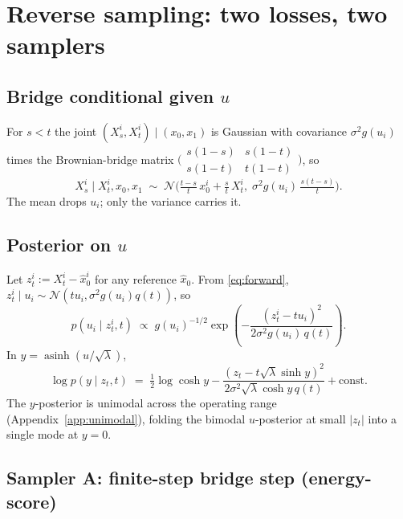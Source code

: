 \documentclass[11pt]{article}
\newcommand{\N}{\mathcal{N}}
\newcommand{\asinh}{\operatorname{asinh}}
\begin{document}
\section{Reverse sampling: two losses, two samplers}
\label{sec:reverse}

\subsection{Bridge conditional given $u$}

For $s<t$ the joint $(X_s^i, X_t^i)\mid(x_0,x_1)$ is Gaussian with
covariance $\sigma^2 g(u_i)$ times the Brownian-bridge matrix
$\bigl(\begin{smallmatrix} s(1-s) & s(1-t) \\ s(1-t) & t(1-t) \end{smallmatrix}\bigr)$,
so
\begin{equation}
    X_s^i \mid X_t^i, x_0, x_1
    \;\sim\; \N\!\Big(\tfrac{t-s}{t}\, x_0^i + \tfrac{s}{t}\, X_t^i,\;
    \sigma^2 g(u_i)\,\tfrac{s(t-s)}{t}\Big).
    \label{eq:cond-generic}
\end{equation}
The mean drops $u_i$; only the variance carries it.

\subsection{Posterior on $u$}

Let $z_t^i := X_t^i - \hat x_0^i$ for any reference $\hat x_0$. From
\eqref{eq:forward}, $z_t^i\mid u_i \sim \N(t u_i, \sigma^2 g(u_i) q(t))$, so
\begin{equation}
    p(u_i\mid z_t^i, t)\;\propto\;g(u_i)^{-1/2}\exp\!\left(-\frac{(z_t^i - t u_i)^2}{2\sigma^2 g(u_i)\,q(t)}\right).
    \label{eq:post-generic}
\end{equation}
In $y=\asinh(u/\sqrt\lambda)$,
\begin{equation}
    \log p(y\mid z_t,t) \;=\; \tfrac{1}{2}\log\cosh y - \frac{(z_t - t\sqrt\lambda\sinh y)^2}{2\sigma^2\sqrt\lambda\cosh y\,q(t)} + \text{const}.
    \label{eq:post-y}
\end{equation}
The $y$-posterior is unimodal across the operating range
(Appendix~\ref{app:unimodal}), folding the bimodal $u$-posterior at
small $|z_t|$ into a single mode at $y=0$.

\subsection{Sampler A: finite-step bridge step (energy-score)}
\label{sec:sampler-es}
\end{document}

